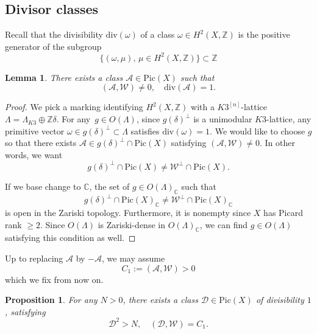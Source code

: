 \documentclass[11pt]{amsart}
\theoremstyle{plain}
\newtheorem{lem}[thm]{Lemma}
\newtheorem{prop}[thm]{Proposition}
\theoremstyle{definition}
\theoremstyle{remark}
\newcommand{\BZ}{{\mathbb{Z}}}
\newcommand{\CA}{{\mathcal A}}
\newcommand{\CD}{{\mathcal D}}
\newcommand{\CW}{{\mathcal W}}
\begin{document}
\subsection{Divisor classes}
Recall that the divisibility $\mathrm{div}(\omega)$ of a class $\omega \in H^2(X, \BZ)$ is the positive generator of the subgroup
\[
\{(\omega, \mu), \, \mu \in H^2(X, \BZ)\} \subset \BZ
\]

\begin{lem}
There exists a class $\CA\in \mathrm{Pic}(X)$ such that
\[
(\CA, \CW) \neq 0, \quad \mathrm{div}(\CA) = 1.
\]
\end{lem}

\begin{proof}
    We pick a marking identifying $H^2(X, \BZ)$ with a $K3^{[n]}$-lattice $\Lambda = \Lambda_{K3} \oplus \BZ\delta$. 
    For any~$g\in O(\Lambda)$, since $g(\delta)^\perp$ is a unimodular $K3$-lattice, any primitive vector $\omega \in g(\delta)^\perp \subset \Lambda$ satisfies $\mathrm{div}(\omega) =1.$    
   We would like to choose $g$ so that there exists 
   $\CA \in g(\delta)^\perp \cap \mathrm{Pic}(X)$ satisfying $(\CA, \CW) \neq 0$.     
   In other words, we want 
   \[
   g(\delta)^\perp \cap \mathrm{Pic}(X) \neq \CW^\perp \cap  \mathrm{Pic}(X).
   \]
   
   If we base change to $\mathbb{C}$, the set of $g \in O(\Lambda)_{\mathbb{C}}$ such that
   \[
   g(\delta)^\perp \cap \mathrm{Pic}(X)_{\mathbb{C}} \neq \CW^\perp \cap  \mathrm{Pic}(X)_{\mathbb{C}}
   \]
    is open in the Zariski topology.  Furthermore, it is nonempty since $X$ has Picard rank $\geq 2$. Since $O(\Lambda)$ is Zariski-dense in $O(\Lambda)_{\mathbb{C}}$, we can find $g \in O(\Lambda)$ satisfying this condition as well.
\end{proof}

Up to replacing $\CA$ by $-\CA$, we may assume
\[
C_1:= (\CA, \CW) > 0
\]
which we fix from now on.

\begin{prop}\label{prop2.2}
For any $N>0$, there exists a class $\CD\in \mathrm{Pic}(X)$ of divisibility $1$, satisfying
\[
\CD^2>N, \quad (\CD,\CW) = C_1.
\]
\end{prop}
\end{document}
